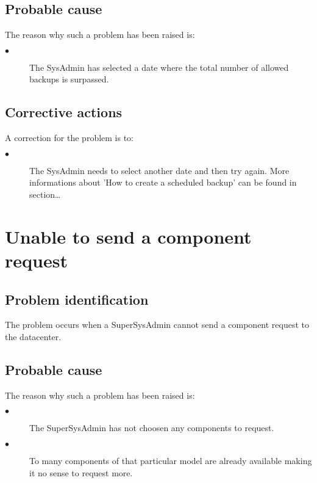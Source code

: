 \subsection{Probable cause}

The reason why such a problem has been raised is:\\
\begin{description}
\item[$\bullet$] The SysAdmin has selected a date where the total number of
allowed backups is surpassed.
\end{description}


\subsection{Corrective actions}

A correction for the problem is to:\\
\begin{description}
\item[$\bullet$] The SysAdmin needs to select another date and then try again.
More informations about 'How to create a scheduled backup' can be found in
section\ldots

\end{description}









\section{Unable to send a component request}

\subsection{Problem identification}
The problem occurs when a SuperSysAdmin cannot send a component request to the
datacenter.

\subsection{Probable cause}

The reason why such a problem has been raised is:\\
\begin{description}
\item[$\bullet$] The SuperSysAdmin has not choosen any components to request.
\item[$\bullet$] To many components of that particular model are already
available making it no sense to request more.
\end{description}


